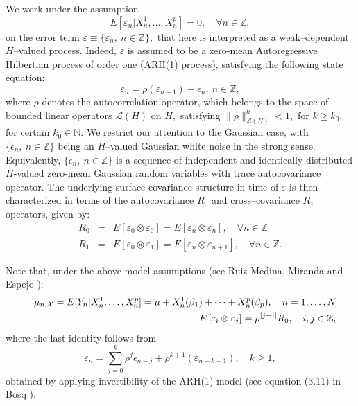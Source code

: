 \documentclass[11pt,a4paper]{article}
\begin{document}
We work under the assumption
\begin{equation}
E\left[\varepsilon_n |  X_{n}^{1},\dots, X_{n}^{p}\right]=0,\quad \forall n\in \mathbb{Z},
\label{erruncorrelated}
\end{equation}
\noindent on the  error term  $\varepsilon\equiv \{\varepsilon_{n},\ n\in \mathbb{Z}\},$  that here is interpreted as a weak--dependent $H$--valued  process.
Indeed,   $\varepsilon $ is assumed to be a  zero-mean Autoregressive Hilbertian process of order one  (ARH(1) process), satisfying the following state equation:
\begin{equation}\varepsilon_n=\rho(\varepsilon_{n-1})+\epsilon_{n}, \ n\in\mathbb{Z},\label{ARHerroerterm}
\end{equation}
\noindent where $\rho$ denotes the autocorrelation operator, which belongs to the space of bounded linear operators $\mathcal{L}(H)$ on $H,$ satisfying
$\|\rho\|_{\mathcal{L}(H)}^{k}<1,$ for $k\geq k_{0},$ for certain $k_{0}\in \mathbb{N}.$ We restrict our attention to the Gaussian case,  with
$\{\epsilon_{n},\ n\in \mathbb{Z}\}$ being an $H$--valued Gaussian   white noise in the strong sense.  Equivalently, $\{\epsilon_{n},\ n\in \mathbb{Z}\}$  is a sequence of independent and identically distributed $H$-valued
zero-mean Gaussian random variables with trace autocovariance operator. The underlying surface covariance structure in time of $\varepsilon $ is then characterized in terms of the autocovariance $R_{0}$ and cross--covariance $R_{1}$  operators, given by:  \begin{eqnarray}R_{0}&=&E[\varepsilon_{0}\otimes \varepsilon_{0}]=E[\varepsilon_{n}\otimes\varepsilon_{n}],\quad \forall n\in \mathbb{Z}\nonumber\\ R_{1}&=&E[\varepsilon_{0}\otimes\varepsilon_{1}]=E[\varepsilon_{n}\otimes \varepsilon_{n+1}],\quad \forall n\in \mathbb{Z}.\nonumber\end{eqnarray}

Note that, under the above model assumptions (see Ruiz-Medina,  Miranda and  Espejo \cite{RuizMedinaMirandaEspejo19}):
 \begin{eqnarray}
&& \mu_{n,\mathcal{X}}=E[Y_{n}|X_{n}^{1},\dots, X_{n}^{p}]=\mu+X_{n}^{1}(\beta_{1}) +\dots + X_{n}^{p}(\beta_{p}),\quad
 n=1,\dots,N\nonumber\\
&& \hspace*{1cm} E\left[ \varepsilon_{i}\otimes \varepsilon_{j}\right]
 = \rho^{|j-i|}R_{0},\quad i,j\in \mathbb{Z},
 \label{eqresponse}
 \end{eqnarray}
\noindent    where the last identity follows from
$$\varepsilon_{n}=\sum_{j=0}^{k}\rho^{j}\epsilon_{n-j}+\rho^{k+1}(\varepsilon_{n-k-1}),\quad k\geq 1,$$
\noindent obtained by applying  invertibility of  the ARH(1) model (see equation (3.11) in Bosq \cite{Bosq00}).
\end{document}
